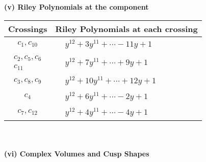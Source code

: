 \documentclass[1p]{elsarticle_modified}
\theoremstyle{definition}
\begin{document}
\newpage\renewcommand{\arraystretch}{1}
\flushleft \textbf{(v) Riley Polynomials at the component}\newline \\
\begin{tabular}{m{50pt}|m{274pt}}
Crossings & \hspace{64pt}Riley Polynomials at each crossing \\
\hline $$\begin{aligned}c_{1},c_{10}\end{aligned}$$&$\begin{aligned}
&y^{12}+3 y^{11}+\cdots-11 y+1
\end{aligned}$\\
\hline $$\begin{aligned}c_{2},c_{5},c_{6}\\c_{11}\end{aligned}$$&$\begin{aligned}
&y^{12}+7 y^{11}+\cdots+9 y+1
\end{aligned}$\\
\hline $$\begin{aligned}c_{3},c_{8},c_{9}\end{aligned}$$&$\begin{aligned}
&y^{12}+10 y^{11}+\cdots+12 y+1
\end{aligned}$\\
\hline $$\begin{aligned}c_{4}\end{aligned}$$&$\begin{aligned}
&y^{12}+6 y^{11}+\cdots-2 y+1
\end{aligned}$\\
\hline $$\begin{aligned}c_{7},c_{12}\end{aligned}$$&$\begin{aligned}
&y^{12}+4 y^{11}+\cdots-4 y+1
\end{aligned}$\\
\hline
\end{tabular}\\~\\
\newpage\flushleft \textbf{(vi) Complex Volumes and Cusp Shapes}
\end{document}
